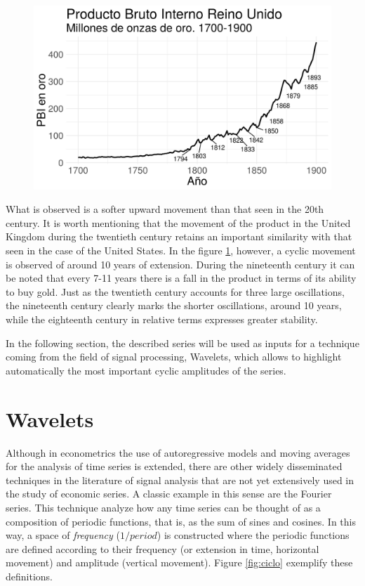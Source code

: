 \documentclass[a4paper]{article}
\begin{document}
\begin{figure}[H]
	\centering
	\includegraphics[width=0.75\linewidth]{uk_gdp.png}
	\caption{} 
	\label{fig:uk_gdp}
\end{figure}


What is observed is a softer upward movement than that seen in the 20th century. It is worth mentioning that the movement of the product in the United Kingdom during the twentieth century retains an important similarity with that seen in the case of the United States. In the figure \ref{fig:uk_gdp}, however, a cyclic movement is observed of around 10 years of extension. During the nineteenth century it can be noted that every 7-11 years there is a fall in the product in terms of its ability to buy gold. Just as the twentieth century accounts for three large oscillations, the nineteenth century clearly marks the shorter oscillations, around 10 years, while the eighteenth century in relative terms expresses greater stability.

In the following section, the described series will be used as inputs for a technique coming from the field of signal processing, Wavelets, which allows to highlight automatically the most important cyclic amplitudes of the series.

\section{Wavelets}

Although in econometrics the use of autoregressive models and moving averages for the analysis of time series is extended, there are other widely disseminated techniques in the literature of signal analysis that are not yet extensively used in the study of economic series. A classic example in this sense are the Fourier series. This technique analyze how any time series can be thought of as a composition of periodic functions, that is, as the sum of sines and cosines. In this way, a space of \textit{frequency} ($1/period$) is constructed where the periodic functions are defined according to their frequency (or extension in time, horizontal movement) and amplitude (vertical movement). Figure \ref{fig:ciclo} exemplify these definitions.
\end{document}
